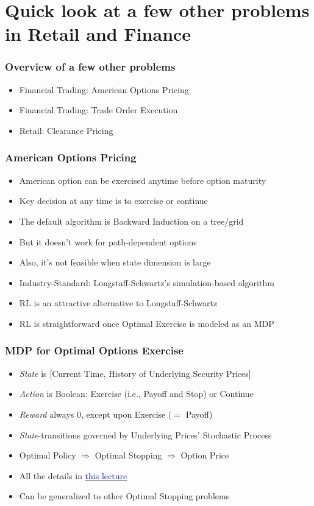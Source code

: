 \documentclass[handout]{beamer}
\begin{document}
\section{Quick look at a few other problems in Retail and Finance}

\begin{frame}
\frametitle{Overview of a few other problems}
\begin{itemize}
\item Financial Trading: American Options Pricing
\item Financial Trading: Trade Order Execution
\item Retail: Clearance Pricing 
\end{itemize}
\end{frame}

\begin{frame}
\frametitle{American Options Pricing}
\pause
\begin{itemize}[<+->]
\item American option can be exercised anytime before option maturity
\item Key decision at any time is to exercise or continue
\item The default algorithm is Backward Induction on a tree/grid
\item But it doesn't work for path-dependent options 
\item Also, it's not feasible when state dimension is large
\item Industry-Standard: Longstaff-Schwartz's simulation-based algorithm
\item RL is an attractive alternative to Longstaff-Schwartz
\item RL is straightforward once Optimal Exercise is modeled as an MDP
\end{itemize}
\end{frame}

\begin{frame}
\frametitle{MDP for Optimal Options Exercise}
\pause
\begin{itemize}
\item {\em State} is [Current Time, History of Underlying Security Prices]
\item {\em Action} is Boolean: Exercise (i.e., Payoff and Stop) or Continue
\item {\em Reward} always 0, except upon Exercise ($=$ Payoff)
\item {\em State}-transitions governed by Underlying Prices' Stochastic Process
\item Optimal Policy $\Rightarrow$ Optimal Stopping $\Rightarrow$ Option Price
\item All the details in \href{https://github.com/coverdrive/technical-documents/blob/master/finance/cme241/AmericanOptionsRL.pdf}{\underline{\textcolor{blue}{this lecture}}}
\item Can be generalized to other Optimal Stopping problems
\end{itemize}
\end{frame}
\end{document}
